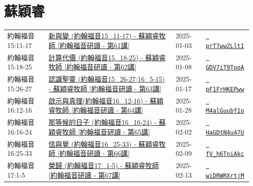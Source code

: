 \documentclass{book}
\begin{document}
\chapter{蘇穎睿}\label{ch:preacher5}
\begin{multicols}{3}
\minitoc
\end{multicols}
{ \scriptsize


\begin{xltabular}{\textwidth}{|p{0.15\textwidth} p{0.6\textwidth}|p{0.07\textwidth} p{0.1\textwidth}|}
\hline
約翰福音 15:11-17 & \hyperref[sec:prT7wwZLltI]{新與變 (約翰福音15\_11-17) - 蘇穎睿牧師 [約翰福音研讀 - 第61講]} & 2025-01-03 & \href{https://youtube.com/watch?v=prT7wwZLltI}{\texttt{ prT7wwZLltI}} \\
約翰福音 15:18-25 & \hyperref[sec:GDV7iT9TooA]{計算代價 (約翰福音15\_18-25) - 蘇穎睿牧師 [約翰福音研讀 - 第62講]} & 2025-01-08 & \href{https://youtube.com/watch?v=GDV7iT9TooA}{\texttt{ GDV7iT9TooA}} \\
約翰福音 15:26-27 & \hyperref[sec:pF1FrHKEPww]{認識聖靈 (約翰福音15\_26-27;16\_5-15) - 蘇穎睿牧師 [約翰福音研讀 - 第63講]} & 2025-01-17 & \href{https://youtube.com/watch?v=pF1FrHKEPww}{\texttt{ pF1FrHKEPww}} \\
約翰福音 16:12-16 & \hyperref[sec:M4alGuubf1o]{啟示與真理(約翰福音16\_12-16) - 蘇穎睿牧師 [約翰福音研讀 - 第64講]} & 2025-01-28 & \href{https://youtube.com/watch?v=M4alGuubf1o}{\texttt{ M4alGuubf1o}} \\
約翰福音 16:16-24 & \hyperref[sec:HaGDtN4u47U]{那等候的日子 (約翰福音16\_16-24) - 蘇穎睿牧師 [約翰福音研讀 - 第65講]} & 2025-02-02 & \href{https://youtube.com/watch?v=HaGDtN4u47U}{\texttt{ HaGDtN4u47U}} \\
約翰福音 16:25-33 & \hyperref[sec:fV_h6TniAkc]{信與覺 (約翰福音16\_25-33) - 蘇穎睿牧師 [約翰福音研讀 - 第66講]} & 2025-02-09 & \href{https://youtube.com/watch?v=fV_h6TniAkc}{\texttt{ fV\_h6TniAkc}} \\
約翰福音 17:1-5 & \hyperref[sec:wiDRWRXrtjM]{榮歸 (約翰福音17\_1-5) - 蘇穎睿牧師 [約翰福音研讀 - 第67講]} & 2025-02-13 & \href{https://youtube.com/watch?v=wiDRWRXrtjM}{\texttt{ wiDRWRXrtjM}} \\
\hline
\end{xltabular}
}
\newpage
\end{document}
